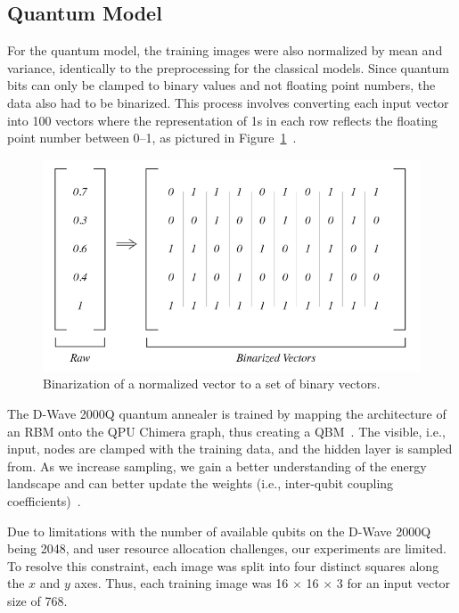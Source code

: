 \documentclass[technologies,article,accept,pdftex,moreauthors]{Definitions/mdpi}
\newcommand{\figref}[1]{Figure~\ref{#1}}
\begin{document}
\subsection{Quantum Model}
\label{binarize}
For the quantum model, the training images were also normalized by mean and variance, identically to the preprocessing for the classical models. Since quantum bits can only be clamped to binary values and not floating point numbers, the data also had to be binarized. This process involves converting each input vector into 100 vectors where the representation of 1s in each row reflects the floating point number between 0--1, as pictured in \figref{fig: binarize}~\cite{Jain2020}.

\begin{figure}[H]
    \includegraphics[width=0.99\columnwidth]{binarize.png}
    \caption{\label{fig: binarize} Binarization of a normalized vector to a set of binary vectors.}
\end{figure}


The D-Wave 2000Q quantum annealer is trained by mapping the architecture of an RBM onto the QPU Chimera graph, thus creating a QBM~\cite{dwavedocs}. The visible, i.e., input, nodes are clamped with the training data, and the hidden layer is sampled from. As we increase sampling, we gain a better understanding of the energy landscape and can better update the weights (i.e., inter-qubit coupling coefficients)~\cite{Jain2020}.


Due to limitations with the number of available qubits on the D-Wave 2000Q being 2048, and user resource allocation challenges, our experiments are limited. To resolve this constraint, each image was split into four distinct squares along the $x$ and $y$ axes. Thus, each training image was 16 $\times$ 16 $\times$ 3 for an input vector size of 768.
\end{document}
